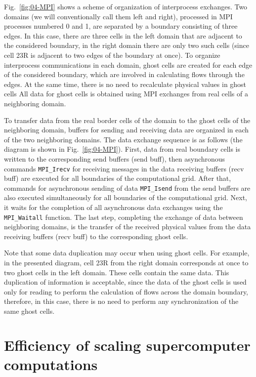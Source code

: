\documentclass[
11pt,%
tightenlines,%
twoside,%
onecolumn,%
nofloats,%
nobibnotes,%
nofootinbib,%
superscriptaddress,%
noshowpacs,%
centertags]%
{revtex4}
\begin{document}
Fig.~\ref{fig:04-MPI} shows a scheme of organization of interprocess exchanges.
Two domains (we will conventionally call them left and right), processed in MPI processes numbered 0 and 1, are separated by a boundary consisting of three edges.
In this case, there are three cells in the left domain that are adjacent to the considered boundary, in the right domain there are only two such cells (since cell 23R is adjacent to two edges of the boundary at once).
To organize interprocess communications in each domain, ghost cells are created for each edge of the considered boundary, which are involved in calculating flows through the edges.
At the same time, there is no need to recalculate physical values in ghost cells
All data for ghost cells is obtained using MPI exchanges from real cells of a neighboring domain.

To transfer data from the real border cells of the domain to the ghost cells of the neighboring domain, buffers for sending and receiving data are organized in each of the two neighboring domains.
The data exchange sequence is as follows (the diagram is shown in Fig.~\ref{fig:04-MPI}).
First, data from real boundary cells is written to the corresponding send buffers (send buff), then asynchronous commands \texttt{MPI\_Irecv} for receiving messages in the data receiving buffers (recv buff) are executed for all boundaries of the computational grid.
After that, commands for asynchronous sending of data \texttt{MPI\_Isend} from the send buffers are also executed simultaneously for all boundaries of the computational grid.
Next, it waits for the completion of all asynchronous data exchanges using the \texttt{MPI\_Waitall} function.
The last step, completing the exchange of data between neighboring domains, is the transfer of the received physical values from the data receiving buffers (recv buff) to the corresponding ghost cells.

Note that some data duplication may occur when using ghost cells.
For example, in the presented diagram, cell 23R from the right domain corresponds at once to two ghost cells in the left domain.
These cells contain the same data.
This duplication of information is acceptable, since the data of the ghost cells is used only for reading to perform the calculation of flows across the domain boundary, therefore, in this case, there is no need to perform any synchronization of the same ghost cells.

\section{Efficiency of scaling supercomputer computations}
\end{document}
